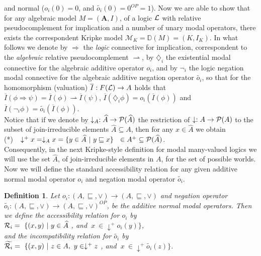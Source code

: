 \documentclass[10pt,twocolumn]{article}
\newcommand{\M}{\mathcal{M}} \newcommand{\N}{\mathcal{N}}
\newtheorem{definition}{Definition}
\begin{document}
 and normal ($o_i(0) = 0$, and $\widetilde{o_i}(0) = 0^{OP} = 1$).
 Now we are able to
show that for any algebraic model $M = (\textbf{A}, I)$, of a logic
$\L$ with relative pseudocomplement for implication and a number of
unary modal operators, there exists the correspondent Kripke model $
\M_K = \mathbb{D}(M) = (K,I_K)$. In what follows we denote by
$\Rightarrow$ the \emph{logic} connective for implication,
correspondent to the \emph{algebraic} relative pseudocomplement
$\rightharpoonup$, by $\diamondsuit_i$ the existential modal
connective for the algebraic additive operator $o_i$, and by
$\neg_i$ the logic negation modal connective for the algebraic
additive negation operator $\widetilde{o_i}$, so that for the
homomorphism (valuation) $\overline{I}:F(\L)\rightarrow A$ holds
that $\overline{I}(\phi \Rightarrow \psi) = \overline{I}(\phi)
\rightharpoonup \overline{I}(\psi)$, $\overline{I}(\diamondsuit_i
\phi) = o_i(\overline{I}(\phi))$ and $\overline{I}(\neg_i \phi) =
\widetilde{o_i}(\overline{I}(\phi))$.\\
Notice that if we denote by $\downarrow_A:\widehat{A} \rightarrow
\P(\widehat{A}) $ the restriction of $\downarrow: A
\rightarrow\P(A)$ to the subset of join-irreducible elements
$\widehat{A} \subseteq A$, then for any $x \in \widehat{A}$ we
obtain\\
(*)  $~~\downarrow^+ x = \downarrow_A x = \{y \in
\widehat{A}~|~y \sqsubseteq x\} ~~\in A^+ \subseteq \P(\widehat{A})$. \\
Consequently, in the next Kripke-style definition for modal
many-valued logics we will use the set $\widehat{A}$, of
join-irreducible elements in
$A$, for the set of possible worlds.\\
Now we will define the standard accessibility relation for any given
additive normal modal operator $o_i$ and negation modal operator
$\widetilde{o_i}$.
\begin{definition} \label{def:frame} Let $o_i:(A,\sqsubseteq, \vee) \rightarrow
(A,\sqsubseteq, \vee)$ and  negation operator
$\widetilde{o_i}:(A,\sqsubseteq, \vee) \rightarrow (A,\sqsubseteq,
\vee)^{OP}$, be  the additive normal modal  operators. Then we
define the accessibility
relation for $o_i$ by\\
$\R_i =  ~\{(x,y)~|~y  \in \widehat{A}~$, and $~x~\in \downarrow^+
o_i(y)\}$,\\
and the incompatibility relation for $\widetilde{o_i}$ by\\
$\widetilde{\R_i} =  ~\{(x,y)~|~ z \in A, ~y  \in \downarrow^+ z~$,
and $~x~\in \downarrow^+ \widetilde{o_i}(z)\}$.
\end{definition}
\end{document}
